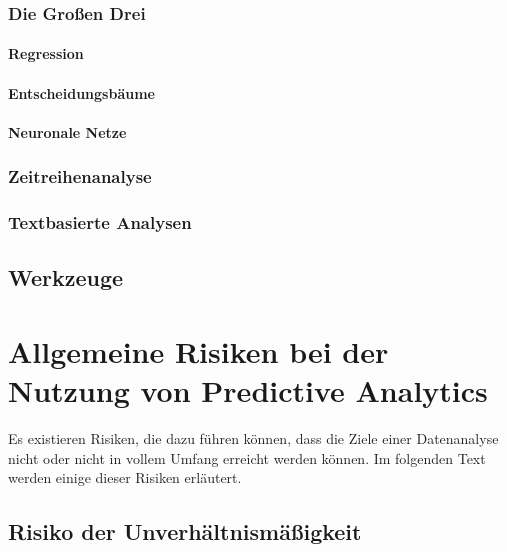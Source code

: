 % 

\subsubsection{Die Großen Drei}

\paragraph{Regression}

\paragraph{Entscheidungsbäume}

\paragraph{Neuronale Netze}

\subsubsection{Zeitreihenanalyse}

\subsubsection{Textbasierte Analysen}

\subsection{Werkzeuge}

\section{Allgemeine Risiken bei der Nutzung von Predictive Analytics}

Es existieren Risiken, die dazu führen können, dass die Ziele einer
Datenanalyse nicht oder nicht in vollem Umfang erreicht werden können.
Im folgenden Text werden einige dieser Risiken erläutert.

\subsection{Risiko der Unverhältnismäßigkeit}

